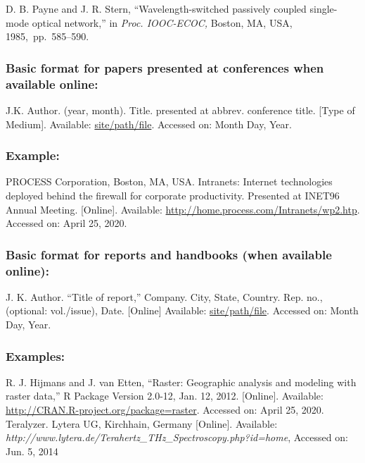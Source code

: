 \documentclass{IEEEoj}
\begin{document}
\begin{thebibliography}{00}
 D. B. Payne and J. R. Stern, ``Wavelength-switched
passively coupled single-mode optical network,'' in \textit{Proc. IOOC-ECOC, }Boston, MA, USA, 1985,~pp.~585--590.
\end{thebibliography}

\subsubsection*{Basic format for papers presented at conferences when available online: }

\begin{thebibliography}{00}
 J.K. Author. (year, month). Title. presented at abbrev. conference title.
[Type of Medium]. Available: \underline{site/path/file}. Accessed on: Month Day, Year.
\end{thebibliography}

\subsubsection*{Example:}

\begin{thebibliography}{00}
 PROCESS Corporation, Boston, MA, USA. Intranets: Internet technologies deployed behind the firewall for corporate productivity. Presented at INET96 Annual Meeting. [Online]. Available: \underline {http://home.process.com/Intranets/wp2.htp}. Accessed on: April 25, 2020.
\end{thebibliography}

\subsubsection*{Basic format for reports and handbooks (when available online): }

\begin{thebibliography}{00}
 J. K. Author. ``Title of report,'' Company. City, State, Country. Rep. no.,
(optional: vol./issue), Date. [Online] Available:
\underline{site/path/file}. Accessed
on: Month Day, Year.
\end{thebibliography}

\subsubsection*{Examples:}

\begin{thebibliography}{00}
 R. J. Hijmans and J. van Etten, ``Raster: Geographic analysis and modeling with raster data,'' R Package Version 2.0-12, Jan. 12, 2012. [Online]. Available: \underline {http://CRAN.R-project.org/package=raster}. Accessed on: April 25, 2020.
 Teralyzer. Lytera UG, Kirchhain, Germany [Online]. Available: \emph{http://www.lytera.de/Terahertz\_THz\_Spectroscopy.php?id=home}, Accessed on: Jun. 5, 2014
\end{thebibliography}
\end{document}
